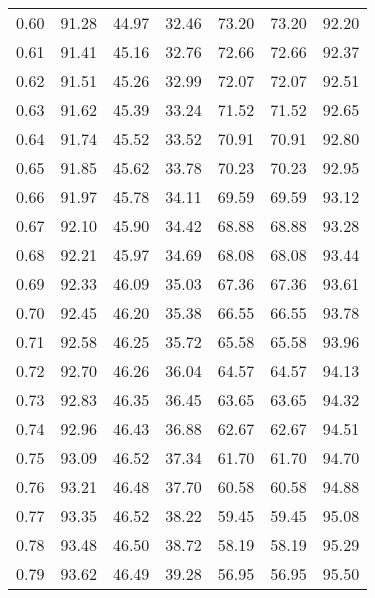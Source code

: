 \begin{tabular}{|c|c|c|c|c|c|c|}
      0.60 &     91.28 &     44.97 &      32.46 &   73.20 &      73.20 &         92.20 \\
      0.61 &     91.41 &     45.16 &      32.76 &   72.66 &      72.66 &         92.37 \\
      0.62 &     91.51 &     45.26 &      32.99 &   72.07 &      72.07 &         92.51 \\
      0.63 &     91.62 &     45.39 &      33.24 &   71.52 &      71.52 &         92.65 \\
      0.64 &     91.74 &     45.52 &      33.52 &   70.91 &      70.91 &         92.80 \\
      0.65 &     91.85 &     45.62 &      33.78 &   70.23 &      70.23 &         92.95 \\
      0.66 &     91.97 &     45.78 &      34.11 &   69.59 &      69.59 &         93.12 \\
      0.67 &     92.10 &     45.90 &      34.42 &   68.88 &      68.88 &         93.28 \\
      0.68 &     92.21 &     45.97 &      34.69 &   68.08 &      68.08 &         93.44 \\
      0.69 &     92.33 &     46.09 &      35.03 &   67.36 &      67.36 &         93.61 \\
      0.70 &     92.45 &     46.20 &      35.38 &   66.55 &      66.55 &         93.78 \\
      0.71 &     92.58 &     46.25 &      35.72 &   65.58 &      65.58 &         93.96 \\
      0.72 &     92.70 &     46.26 &      36.04 &   64.57 &      64.57 &         94.13 \\
      0.73 &     92.83 &     46.35 &      36.45 &   63.65 &      63.65 &         94.32 \\
      0.74 &     92.96 &     46.43 &      36.88 &   62.67 &      62.67 &         94.51 \\
      0.75 &     93.09 &     46.52 &      37.34 &   61.70 &      61.70 &         94.70 \\
      0.76 &     93.21 &     46.48 &      37.70 &   60.58 &      60.58 &         94.88 \\
      0.77 &     93.35 &     46.52 &      38.22 &   59.45 &      59.45 &         95.08 \\
      0.78 &     93.48 &     46.50 &      38.72 &   58.19 &      58.19 &         95.29 \\
      0.79 &     93.62 &     46.49 &      39.28 &   56.95 &      56.95 &         95.50 \\

\end{tabular}
